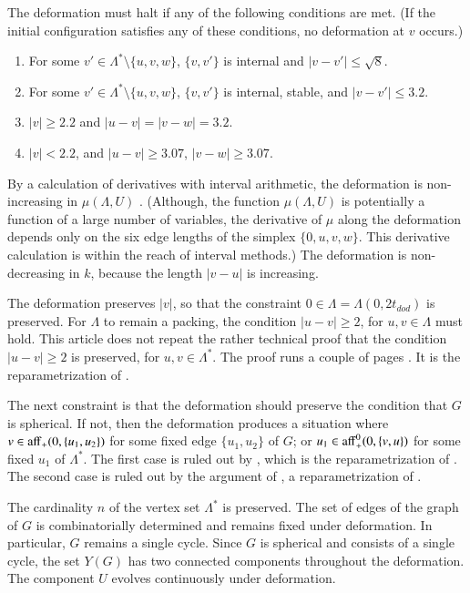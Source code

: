 \documentclass{article} %
\begin{document}
The deformation must halt if any of the following conditions
are met.  (If the initial configuration satisfies any of these conditions,
no deformation at $v$ occurs.)
\begin{enumerate}\label{e:halt}
\item For some $v'\in\Lambda^*\setminus\{u,v,w\}$, 
$\{v,v'\}$ is internal and $|v-v'|\le \sqrt8$.
\item For some $v'\in\Lambda^*\setminus\{u,v,w\}$,
$\{v,v'\}$ is internal, stable, and $|v-v'|\le 3.2$.
\item $|v|\ge 2.2$ and $|u-v|=|v-w|=3.2$.  
\item $|v|< 2.2$, 
and $|u-v|\ge 3.07$, $|v-w|\ge 3.07$.
\end{enumerate}

By a calculation of derivatives with interval arithmetic,
the deformation is non-increasing in $\mu(\Lambda,U)$ \cite[Lemma~7.7]{Hales:2002:Dodec}.  (Although, the function $\mu(\Lambda,U)$ is potentially a 
function of a large number of variables, the derivative of $\mu$
along the deformation depends only on the six edge lengths  of
the simplex $\{0,u,v,w\}$.  This derivative calculation is within
the reach of interval methods.)
The deformation is non-decreasing in $k$, because the length
$|v-u|$ is increasing.

The deformation preserves $|v|$,
so that the constraint $0\in\Lambda=\Lambda(0,2t_{dod})$ is preserved.
For $\Lambda$ to remain a packing,  the condition
 $|u-v|\ge 2$, for $u,v\in \Lambda$ must hold.
This article does not repeat the rather technical proof that
the condition
 $|u-v|\ge 2$ is preserved, for $u,v\in\Lambda^*$.  The proof
runs a couple  of pages \cite[Lemma~7.6]{Hales:2002:Dodec}.
It is the reparametrization of \cite[Lemma~12.20]{Hales:2006:DCG}.

The next constraint is that the deformation should preserve the condition
that $G$ is spherical.  
If not, then the deformation produces
a situation where $v\in {\operatorname{aff}}_+(0,\{u_1,u_2\})$ for some fixed edge $\{u_1,u_2\}$
of $G$; or $u_1\in {\operatorname{aff}}_+^0(0,\{v,u\})$ for some fixed $u_1$ of $\Lambda^*$.
The first case is ruled out by \cite[Remark~p.22]{Hales:2002:Dodec}, which is the reparametrization of \cite[\S12.7,p.132]{Hales:2006:DCG}.  The second case is ruled out by 
the argument of \cite[p.27]{Hales:2002:Dodec}, a reparametrization of 
\cite[\S12.8,p.134]{Hales:2006:DCG}.

The cardinality $n$ of the vertex set $\Lambda^*$ is preserved.
The set of edges of the graph of $G$ is combinatorially determined and
remains fixed under deformation.  In particular, $G$ remains a single
cycle.  Since $G$ is spherical and consists of a single
cycle, the set $Y(G)$ has two connected components throughout the
deformation.  The component $U$ evolves continuously under deformation.   
\end{document}
